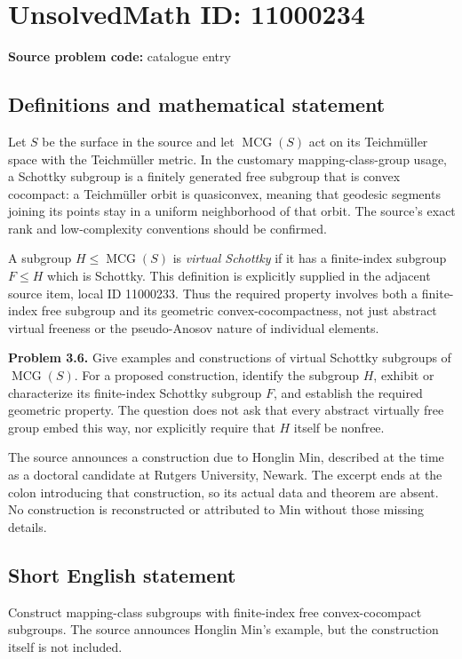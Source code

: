 \documentclass[11pt]{article}
\begin{document}
\section*{UnsolvedMath ID: 11000234}
\textbf{Source problem code:} catalogue entry
\subsection{Definitions and mathematical statement}
Let $S$ be the surface in the source and let $\operatorname{MCG}(S)$ act on its Teichm\"uller space with the Teichm\"uller metric. In the customary mapping-class-group usage, a Schottky subgroup is a finitely generated free subgroup that is convex cocompact: a Teichm\"uller orbit is quasiconvex, meaning that geodesic segments joining its points stay in a uniform neighborhood of that orbit. The source's exact rank and low-complexity conventions should be confirmed.

A subgroup $H\le\operatorname{MCG}(S)$ is \emph{virtual Schottky} if it has a finite-index subgroup $F\le H$ which is Schottky. This definition is explicitly supplied in the adjacent source item, local ID 11000233. Thus the required property involves both a finite-index free subgroup and its geometric convex-cocompactness, not just abstract virtual freeness or the pseudo-Anosov nature of individual elements.

\textbf{Problem 3.6.} Give examples and constructions of virtual Schottky subgroups of $\operatorname{MCG}(S)$. For a proposed construction, identify the subgroup $H$, exhibit or characterize its finite-index Schottky subgroup $F$, and establish the required geometric property. The question does not ask that every abstract virtually free group embed this way, nor explicitly require that $H$ itself be nonfree.

The source announces a construction due to Honglin Min, described at the time as a doctoral candidate at Rutgers University, Newark. The excerpt ends at the colon introducing that construction, so its actual data and theorem are absent. No construction is reconstructed or attributed to Min without those missing details.
\subsection{Short English statement}
Construct mapping-class subgroups with finite-index free convex-cocompact subgroups. The source announces Honglin Min's example, but the construction itself is not included.
\end{document}
